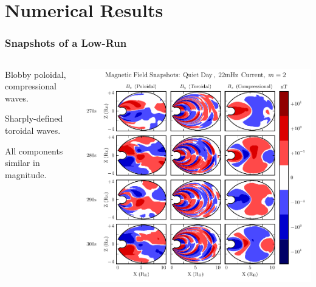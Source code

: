 \documentclass{beamer}
\begin{document}

\section{Numerical Results}


\begin{frame}
\frametitle{Snapshots of a Low-\azm Run}

\begin{columns}
\begin{wideitemize}
\item Blobby poloidal, compressional waves. 
\item Sharply-defined toroidal waves. 
\item All components similar in magnitude. 
\end{wideitemize}
\includegraphics[width=\textwidth]{figures/snapshot_smallm.pdf}
\end{columns}

\end{frame}
\end{document}
